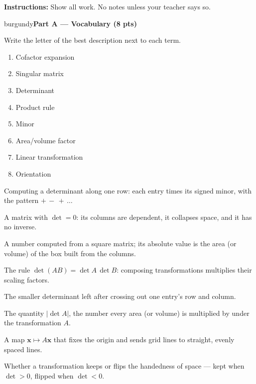 \documentclass[10pt]{article}
\newcommand{\xx}{\mathbf{x}}
\newcommand{\parthead}[1]{%
  \vspace{6pt}\noindent
  \begin{headlinebox}{burgundy}{\color{white}\bfseries #1}\end{headlinebox}%
  \vspace{4pt}}
\begin{document}
\namedateperiod

\vspace{0.06in}
\noindent\textbf{Instructions:} Show all work. No notes unless your teacher says so.

\parthead{Part A --- Vocabulary (8 pts)}
Write the letter of the best description next to each term.

\vspace{4pt}
\noindent
\begin{minipage}[t]{0.40\textwidth}
\begin{enumerate}[leftmargin=2.2em, itemsep=7pt, label=\arabic*.]
  \item Cofactor expansion 
  \item Singular matrix 
  \item Determinant 
  \item Product rule 
  \item Minor 
  \item Area/volume factor 
  \item Linear transformation 
  \item Orientation 
\end{enumerate}
\end{minipage}%
\hfill
\begin{minipage}[t]{0.57\textwidth}
\small
\begin{description}[leftmargin=1.4em, itemsep=3pt]
  \item[(A)] Computing a determinant along one row: each entry times its signed minor, with the pattern $+\,-\,+\,\dots$
  \item[(B)] A matrix with $\det=0$: its columns are dependent, it collapses space, and it has no inverse.
  \item[(C)] A number computed from a square matrix; its absolute value is the area (or volume) of the box built from the columns.
  \item[(D)] The rule $\det(AB)=\det A\,\det B$: composing transformations multiplies their scaling factors.
  \item[(E)] The smaller determinant left after crossing out one entry's row and column.
  \item[(F)] The quantity $|\det A|$, the number every area (or volume) is multiplied by under the transformation $A$.
  \item[(G)] A map $\xx\mapsto A\xx$ that fixes the origin and sends grid lines to straight, evenly spaced lines.
  \item[(H)] Whether a transformation keeps or flips the handedness of space --- kept when $\det>0$, flipped when $\det<0$.
\end{description}
\end{minipage}
\end{document}
